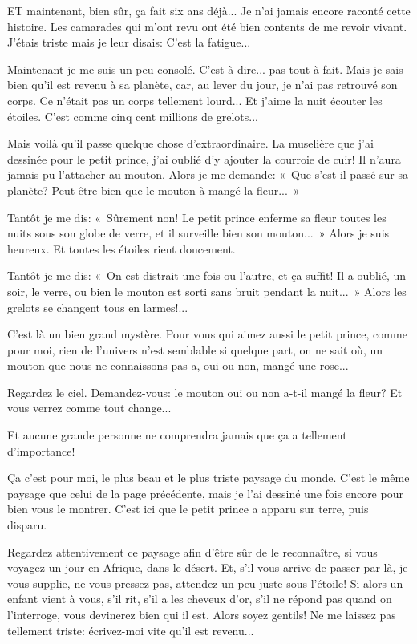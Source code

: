 \documentclass{report}
\begin{document}

\parachapter{} %

ET maintenant, bien sûr, ça fait six ans déjà... Je n'ai jamais encore raconté cette histoire. Les camarades qui m'ont revu ont été bien contents de me revoir vivant. J'étais triste mais je leur disais: C'est la fatigue...

Maintenant je me suis un peu consolé. C'est à dire... pas tout à fait. Mais je sais bien qu'il est revenu à sa planète, car, au lever du jour, je n'ai pas retrouvé son corps. Ce n'était pas un corps tellement lourd... Et j'aime la nuit écouter les étoiles. C'est comme cinq cent millions de grelots...

Mais voilà qu'il passe quelque chose d'extraordinaire. La muselière que j'ai dessinée pour le petit prince, j'ai oublié d'y ajouter la courroie de cuir! Il n'aura jamais pu l'attacher au mouton. Alors je me demande: «~Que s'est-il passé sur sa planète? Peut-être bien que le mouton à mangé la fleur...~»

Tantôt je me dis: «~Sûrement non! Le petit prince enferme sa fleur toutes les nuits sous son globe de verre, et il surveille bien son mouton...~» Alors je suis heureux. Et toutes les étoiles rient doucement.

Tantôt je me dis: «~On est distrait une fois ou l'autre, et ça suffit! Il a oublié, un soir, le verre, ou bien le mouton est sorti sans bruit pendant la nuit...~» Alors les grelots se changent tous en larmes!...

C'est là un bien grand mystère. Pour vous qui aimez aussi le petit prince, comme pour moi, rien de l'univers n'est semblable si quelque part, on ne sait où, un mouton que nous ne connaissons pas a, oui ou non, mangé une rose...

Regardez le ciel. Demandez-vous: le mouton oui ou non a-t-il mangé la fleur? Et vous verrez comme tout change...

Et aucune grande personne ne comprendra jamais que ça a tellement d'importance!


Ça c'est pour moi, le plus beau et le plus triste paysage du monde. C'est le même paysage que celui de la page précédente, mais je l'ai dessiné une fois encore pour bien vous le montrer. C'est ici que le petit prince a apparu sur terre, puis disparu.

Regardez attentivement ce paysage afin d'être sûr de le reconnaître, si vous voyagez un jour en Afrique, dans le désert. Et, s'il vous arrive de passer par là, je vous supplie, ne vous pressez pas, attendez un peu juste sous l'étoile! Si alors un enfant vient à vous, s'il rit, s'il a les cheveux d'or, s'il ne répond pas quand on l'interroge, vous devinerez bien qui il est. Alors soyez gentils! Ne me laissez pas tellement triste: écrivez-moi vite qu'il est revenu...
\end{document}
